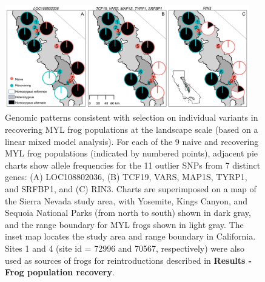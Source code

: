 \documentclass[9pt,twocolumn,twoside,lineno]{pnas-new}
\begin{document}
\begin{figure}

{\centering \includegraphics[width=0.95\textwidth]{figures/allele_maps.png}

}

\caption{\label{fig-allelefrequencies}Genomic patterns consistent with
selection on individual variants in recovering MYL frog populations at
the landscape scale (based on a linear mixed model analysis). For each
of the 9 naive and recovering MYL frog populations (indicated by
numbered points), adjacent pie charts show allele frequencies for the 11
outlier SNPs from 7 distinct genes: (A) LOC108802036, (B) TCF19, VARS,
MAP1S, TYRP1, and SRFBP1, and (C) RIN3. Charts are superimposed on a map
of the Sierra Nevada study area, with Yosemite, Kings Canyon, and
Sequoia National Parks (from north to south) shown in dark gray, and the
range boundary for MYL frogs shown in light gray. The inset map locates
the study area and range boundary in California. Sites 1 and 4 (site id
= 72996 and 70567, respectively) were also used as sources of frogs for
reintroductions described in \textbf{Results - Frog population
recovery}.}

\end{figure}

\newpage
\end{document}
